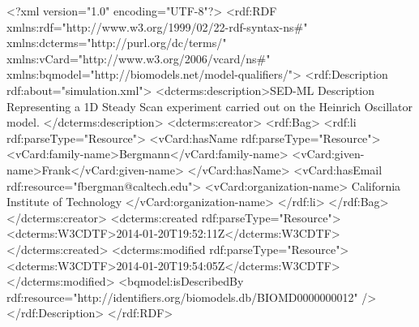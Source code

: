 \begin{example}
<?xml version="1.0" encoding="UTF-8"?>
<rdf:RDF xmlns:rdf="http://www.w3.org/1999/02/22-rdf-syntax-ns#" 
         xmlns:dcterms="http://purl.org/dc/terms/" 
         xmlns:vCard="http://www.w3.org/2006/vcard/ns#"
         xmlns:bqmodel="http://biomodels.net/model-qualifiers/">
   <rdf:Description rdf:about="simulation.xml">
      <dcterms:description>SED-ML Description Representing a 1D Steady Scan 
			   experiment carried out on the Heinrich Oscillator model. 
			</dcterms:description>
      <dcterms:creator>
         <rdf:Bag>
            <rdf:li rdf:parseType="Resource">
               <vCard:hasName rdf:parseType="Resource">
                  <vCard:family-name>Bergmann</vCard:family-name>
                  <vCard:given-name>Frank</vCard:given-name>
               </vCard:hasName>
               <vCard:hasEmail rdf:resource="fbergman@caltech.edu">
               <vCard:organization-name>
		      California Institute of Technology
	       </vCard:organization-name>
            </rdf:li>
         </rdf:Bag>
      </dcterms:creator>
      <dcterms:created rdf:parseType="Resource">
         <dcterms:W3CDTF>2014-01-20T19:52:11Z</dcterms:W3CDTF>
      </dcterms:created>
      <dcterms:modified rdf:parseType="Resource">
         <dcterms:W3CDTF>2014-01-20T19:54:05Z</dcterms:W3CDTF>
      </dcterms:modified>
     <bqmodel:isDescribedBy rdf:resource="http://identifiers.org/biomodels.db/BIOMD0000000012" /> 
   </rdf:Description>
</rdf:RDF>
\end{example}
